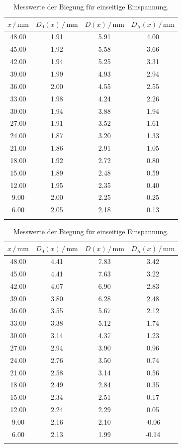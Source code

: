 \begin{table}
\centering
\caption{Messwerte der Biegung für einseitige Einspannung.}
\begin{tabular}[t]{cccc}
    \toprule
    $x\,/\,\si{\milli\meter}$ & $D_0(x) \,/\, \si{\milli\meter}$ & $D(x) \,/\, \si{\milli\meter}$ & $D_\text{A}(x) \,/\, \si{\milli\meter}$\\
    \midrule
    48.00 & 1.91 & 5.91 & 4.00 \\
    45.00 & 1.92 & 5.58 & 3.66 \\
    42.00 & 1.94 & 5.25 & 3.31 \\
    39.00 & 1.99 & 4.93 & 2.94 \\
    36.00 & 2.00 & 4.55 & 2.55 \\
    33.00 & 1.98 & 4.24 & 2.26 \\
    30.00 & 1.94 & 3.88 & 1.94 \\
    27.00 & 1.91 & 3.52 & 1.61 \\
    24.00 & 1.87 & 3.20 & 1.33 \\
    21.00 & 1.86 & 2.91 & 1.05 \\
    18.00 & 1.92 & 2.72 & 0.80 \\
    15.00 & 1.89 & 2.48 & 0.59 \\
    12.00 & 1.95 & 2.35 & 0.40 \\
    9.00 & 2.00 & 2.25 & 0.25 \\
    6.00 & 2.05 & 2.18 & 0.13 \\
    \bottomrule
    \label{tab:ein_eckig}
\end{tabular}
\begin{tabular}[t]{cccc}
    \toprule
    $x\,/\,\si{\milli\meter}$ & $D_0(x) \,/\, \si{\milli\meter}$ & $D(x) \,/\, \si{\milli\meter}$ & $D_\text{A}(x) \,/\, \si{\milli\meter}$\\
    \midrule
    48.00 & 4.41 & 7.83 & 3.42 \\
    45.00 & 4.41 & 7.63 & 3.22 \\
    42.00 & 4.07 & 6.90 & 2.83 \\
    39.00 & 3.80 & 6.28 & 2.48 \\
    36.00 & 3.55 & 5.67 & 2.12 \\
    33.00 & 3.38 & 5.12 & 1.74 \\
    30.00 & 3.14 & 4.37 & 1.23 \\
    27.00 & 2.94 & 3.90 & 0.96 \\
    24.00 & 2.76 & 3.50 & 0.74 \\
    21.00 & 2.58 & 3.14 & 0.56 \\
    18.00 & 2.49 & 2.84 & 0.35 \\
    15.00 & 2.34 & 2.51 & 0.17 \\
    12.00 & 2.24 & 2.29 & 0.05 \\
    9.00 & 2.16 & 2.10 & -0.06 \\
    6.00 & 2.13 & 1.99 & -0.14 \\
    \bottomrule
    \label{tab:ein_rund}
\end{tabular}
\label{tab:einseitig_komplett}
\end{table}

